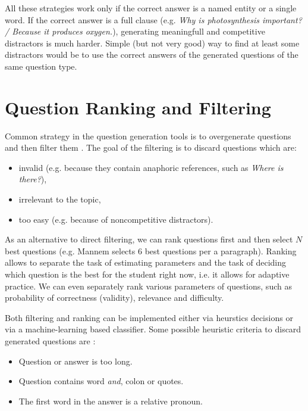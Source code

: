 \documentclass[a4paper, 12pt, twoside]{fithesis2}		%
\renewcommand{\_}{\leavevmode \kern0.07em\vbox{\hrule width0.4em}}
\newcommand{\squarebullet}{\textcolor{black}{\raisebox{0.15em}{\rule{4pt}{4pt}}}}
\newcommand{\emptysquarebullet}{\textcolor{black}{\raisebox{0.10em}{\tiny$\square$}}}
\newenvironment{myItemize}{
  \begin{itemize}[leftmargin=2em,rightmargin=1em,itemsep=\parskip ,parsep=0em,topsep=0em,partopsep=0em]
  \renewcommand{\labelitemi}{\squarebullet}
  \renewcommand{\labelitemii}{\textbullet}
}{
  \end{itemize}
}
\begin{document}
\noindent
All these strategies work only if the correct answer is a named entity or a single word.
If the correct answer is a full clause
(e.g. \emph{Why is photosynthesis important? / Because it produces oxygen.}),
generating meaningfull and competitive distractors is much harder.
Simple (but not very good) way to find at least some distractors would be to use the correct answers of the generated questions of the same question type.


\section{Question Ranking and Filtering}
\label{sec:questions-ranking-filtering}

Common strategy in the question generation tools
is to overgenerate questions and then filter them
\cite{mentor, question-gen-mannem, question-overgenerating-rating, questions-wolfe}.
The goal of the filtering is to discard questions which are:

\begin{myItemize}
  \item invalid (e.g. because they contain anaphoric references, such as \emph{Where is there?}),
  \item irrelevant to the topic,
  \item too easy (e.g. because of noncompetitive distractors).
\end{myItemize}

As an alternative to direct filtering,
we can rank questions first and then select $N$ best questions
(e.g. Mannem \cite{question-gen-mannem} selects $6$ best questions per a paragraph).
Ranking allows to separate the task of estimating parameters and the task of deciding which question is the best for the student right now, i.e. it allows for adaptive practice.
We can even separately rank various parameters of questions, such as probability of correctness (validity), relevance and difficulty.

Both filtering and ranking can be implemented either via heurstics decisions
or via a machine-learning based classifier.
Some possible heuristic criteria to discard generated questions are \cite{questions-wolfe}:
\begin{myItemize}
\item Question or answer is too long.
\item Question contains word \emph{and}, colon or quotes.
\item The first word in the answer is a relative pronoun.
\end{myItemize}
\end{document}
